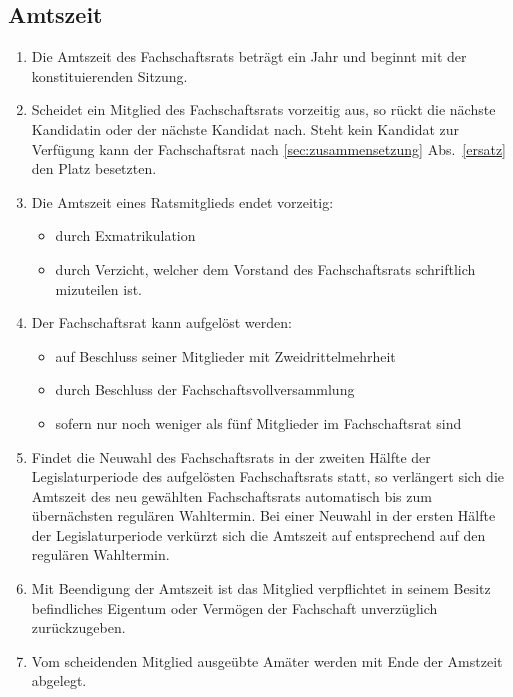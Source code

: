 \subsection{Amtszeit}
\begin{enumerate}
\item Die Amtszeit des Fachschaftsrats beträgt ein Jahr und beginnt mit der konstituierenden Sitzung.
\item Scheidet ein Mitglied des Fachschaftsrats vorzeitig aus, so rückt die nächste Kandidatin  oder der nächste Kandidat nach. Steht kein Kandidat zur Verfügung kann der Fachschaftsrat nach \ref{sec:zusammensetzung} Abs.~\ref{ersatz} den Platz besetzten.
\item Die Amtszeit eines Ratsmitglieds endet vorzeitig:
\begin{itemize}
\item durch Exmatrikulation
\item durch Verzicht, welcher dem Vorstand des Fachschaftsrats schriftlich mizuteilen ist.
\end{itemize}
\item Der Fachschaftsrat kann aufgelöst werden:
\begin{itemize}
\item auf Beschluss seiner Mitglieder mit Zweidrittelmehrheit
\item durch Beschluss der Fachschaftsvollversammlung
\item sofern nur noch weniger als fünf Mitglieder im Fachschaftsrat sind
\end{itemize}
\item Findet die Neuwahl des Fachschaftsrats in der zweiten Hälfte der Legislaturperiode des aufgelösten Fachschaftsrats statt, so verlängert sich die Amtszeit des neu gewählten Fachschaftsrats automatisch bis zum übernächsten regulären Wahltermin. Bei einer Neuwahl in der ersten Hälfte der Legislaturperiode verkürzt sich die Amtszeit auf entsprechend auf den regulären Wahltermin.
\item Mit Beendigung der Amtszeit ist das Mitglied verpflichtet in seinem Besitz befindliches Eigentum oder Vermögen der Fachschaft unverzüglich zurückzugeben.
\item Vom scheidenden Mitglied ausgeübte Amäter werden mit Ende der Amstzeit abgelegt.
\end{enumerate}